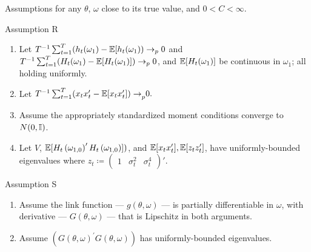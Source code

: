 \documentclass[smaller, aspectratio=169]{beamer}
\begin{document}
\begin{frame}[c]{Assumptions for any $\theta$, $\omega$ close to its true value, and $ 0 < C < \infty$.}

  \begin{block}{Assumption R}
    \label{assump:R}
%    
    \begin{enumerate}
      \item Let $T^{-1}\sum_{t=1}^{T}(h_{t}(\omega_{1})-\mathbb{E}[ h_{t}(\omega_{1}))\rightarrow_{p}0$ and $T^{-1}\sum_{t=1}^{T}(H_{t}(\omega_{1})-\mathbb{E}[H_{t}(\omega_{1})])\rightarrow_{p}0$, and $\mathbb{E}[H_{t}(\omega_{1})]$ be continuous in $\omega_{1}$; all holding uniformly.
%
      \item Let $T^{-1}\sum_{t=1}^{T}(x_{t}x_{t}^{\prime}-\mathbb{E}[ x_{t}x_{t}^{\prime}{])\rightarrow}_{p}0.$
%
      \item Assume the appropriately standardized moment conditions converge to $N(0, \mathbb{I})$.
%
  \item Let $V$, $\mathbb{E}[H_{t}\left(\omega_{1, 0}\right)^{\prime}H_{t}\left(\omega_{1, 0}\right) ])$, and $\mathbb{E}[x_{t}x_{t}^{\prime}], \mathbb{E}[ z_{t}z_{t}^{\prime}]$,  have uniformly-bounded eigenvalues where $z_{t} \coloneqq \begin{pmatrix} 1 & \sigma_{t}^{2} & \sigma_{t}^{4} \end{pmatrix}'$.
%
    \end{enumerate}
  \end{block}
  
  \vfill

  \begin{block}{Assumption S}
%
    \begin{enumerate}
      \item Assume the link function --- $g(\theta, \omega)$ --- is partially differentiable in $\omega$, with derivative --- $G(\theta, \omega)$ --- that is Lipschitz in both arguments. 
      \item Assume $(G(\theta, \omega)^{\prime}G(\theta, \omega))$ has uniformly-bounded eigenvalues.
    \end{enumerate}

  \end{block}

\end{frame}
\end{document}
